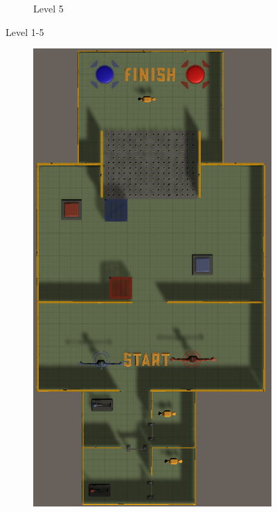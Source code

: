 \begin{figure}[h!]
\begin{subfigure}[b]{0.45\linewidth}
        \caption{Level 5}
        \label{fig:level 5}
      \end{subfigure}
    \caption{Level 1-5}
\end{figure}


\newpage
\begin{figure}[h!]
    \centering    
    \begin{subfigure}[b]{0.45\linewidth}
        \includegraphics[width=\linewidth]{images/level_6.png}

\end{subfigure}
\end{figure}

